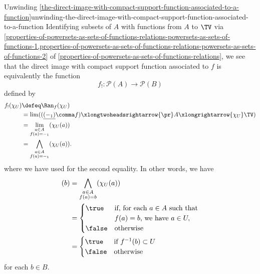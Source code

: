 \begin{remark}{Unwinding \cref{the-direct-image-with-compact-support-function-associated-to-a-function}}{unwinding-the-direct-image-with-compact-support-function-associated-to-a-function}%
    Identifying subsets of $A$ with functions from $A$ to $\TV$ via \cref{properties-of-powersets-as-sets-of-functions-relations-powersets-as-sets-of-functions-1,properties-of-powersets-as-sets-of-functions-relations-powersets-as-sets-of-functions-2} of \cref{properties-of-powersets-as-sets-of-functions-relations}, we see that the direct image with compact support function associated to $f$ is equivalently the function
    \[
        f_{!}%
        \colon%
        \mathcal{P}(A)%
        \to%
        \mathcal{P}(B)%
    \]%
    defined by
    \begin{align*}
        f_{!}(\chi_{U}) &\defeq \Ran_{f}(\chi_{U})\\%
                        &=      \lim((\underline{(-_{1})}\comma f)\xlongtwoheadsrightarrow{\pr}A\xlongrightarrow{\chi_{U}}\TV)\\%
                        &=      \lim_{\substack{a\in A\\f(a)=-_{1}}}(\chi_{U}(a))\\%
                        &=      \bigwedge_{\substack{a\in A\\f(a)=-_{1}}}(\chi_{U}(a)).%
    \end{align*}
    where we have used  for the second equality. In other words, we have
    \begin{align*}
        [f_{!}(\chi_{U})](b)%
        &=%
        \bigwedge_{\substack{a\in A\\f(a)=b}}(\chi_{U}(a))\\%
        &=%
        \begin{cases}
            \true  &\text{if, for each $a\in A$ such that}\\
                   &\text{$f(a)=b$, we have $a\in U,$}\\
            \false &\text{otherwise}
        \end{cases}\\
        &=%
        \begin{cases}
            \true  &\text{if $f^{-1}(b)\subset U$}\\
            \false &\text{otherwise}
        \end{cases}
    \end{align*}
    for each $b\in B$.
\end{remark}
